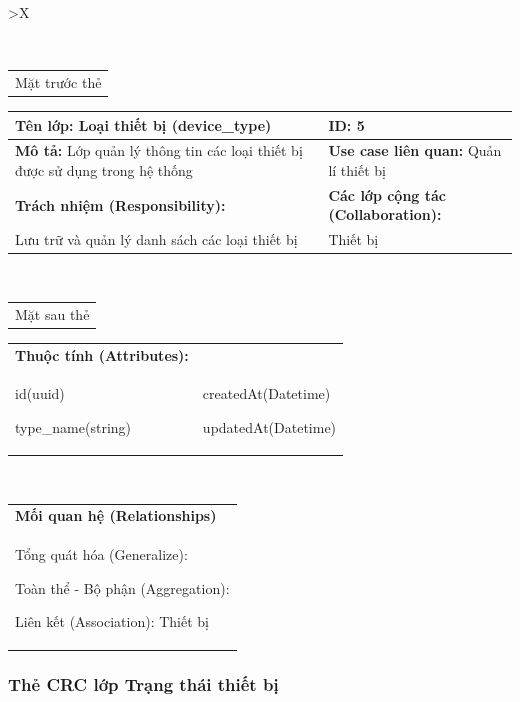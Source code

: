 \begin{xltabular}{\textwidth}{
		>{\centering\arraybackslash}X
	}
	\caption{\bfseries \fontsize{12pt}{0pt}\selectfont Thẻ CRC lớp Loại thiết bị}
	\\
	\begin{tabularx}{0.9\textwidth}{X}
		Mặt trước thẻ
	\end{tabularx}
	\begin{tabularx}{0.9\textwidth}{|X|X|}
		\hline
		\textbf{Tên lớp:} Loại thiết bị (device\_type)                                      & \textbf{ID:} 5                                 \\
		\hline
		\textbf{Mô tả:} Lớp quản lý thông tin các loại thiết bị được sử dụng trong hệ thống & \textbf{Use case liên quan:}  Quản lí thiết bị \\
		\hline
		\textbf{Trách nhiệm (Responsibility):}                                              & \textbf{Các lớp cộng tác (Collaboration):}     \\
		Lưu trữ và quản lý danh sách các loại thiết bị
		                                                                                    &
		Thiết bị
		\\
		\hline
	\end{tabularx}
	\\
	\begin{tabularx}{0.9\textwidth}{X}
		Mặt sau thẻ
	\end{tabularx}
	\begin{tabularx}{0.9\textwidth}{|X|X|}
		\hline
		\textbf{Thuộc tính (Attributes):} & \\
		id(uuid)

		type\_name(string)
		                                  &
		createdAt(Datetime)

		updatedAt(Datetime)
		\\ \hline
	\end{tabularx}
	\\
	\begin{tabularx}{0.9\textwidth}{|X|}
		\hline
		\textbf{Mối quan hệ (Relationships)} \\
		Tổng quát hóa (Generalize):

		Toàn thể - Bộ phận (Aggregation):

		Liên kết (Association): Thiết bị
		\\
		\hline
	\end{tabularx}
\end{xltabular}

\subsubsection{Thẻ CRC lớp Trạng thái thiết bị}

